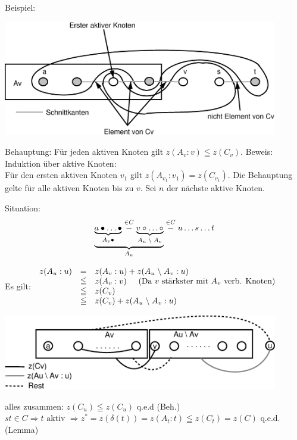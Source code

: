 Beispiel:

\includegraphics[width=12cm]{bilder/3-0Phasenschnitt1}

Behauptung: Für jeden aktiven Knoten gilt $z(A_{v}:v) \leqq z(C_{v})$.
Beweis: Induktion über aktive Knoten:\\
Für den ersten aktiven Knoten $v_{1}$ gilt $z(A_{v_{1}}:v_{1}) =
z(C_{v_{1}})$. Die Behauptung gelte für alle aktiven Knoten bis zu $v$. Sei
$n$ der nächste aktive Knoten.

Situation:\\
\[\underbrace{\underbrace{a \bullet\ldots \bullet}_{A_{v}\bullet}
\stackrel{\in C}{-} \underbrace{v\circ \ldots \circ}_{A_{u} \;\backslash\;
A_{v}}}_{A_{u}}
\stackrel{\in C}{-}u \ldots s \ldots  t\]

Es gilt: $\begin{array}{rcl}z(A_{u}:u) &=& z(A_{v}:u) + z(A_{u} \;\backslash\; A_{v} : 
u)\\
&\leqq& z(A_{v}:v) \hspace{5mm} (\mbox{Da $v$ stärkster mit $A_{v}$ verb.
Knoten})\\
&\leqq& z (C_{v})\\
&\leqq& z (C_{v}) + z ( A_{u} \;\backslash\; A_{v} : u)
\end{array}$

\includegraphics[width=12cm]{bilder/3-0Phasenschnitt2}

alles zusammen: $z(C_{u}) \leqq z(C_{u})$ q.e.d (Beh.)\\
$s t \in C \Rightarrow t \mbox{ aktiv } \Rightarrow  z^{\ast} = z(\delta(t))
= z(A_{t}:t) \leqq z(C_{t}) = z(C)$ q.e.d. (Lemma)

